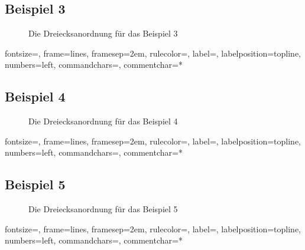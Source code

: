 \documentclass[a4paper, notitlepage, 12pt]{scrartcl}
\begin{document}
\subsection{Beispiel 3}
\begin{figure}[H] 
	
	\caption{Die Dreiecksanordnung für das Beispiel 3}
\end{figure}
%
{fontsize=\footnotesize,
	frame=lines,  %
	framesep=2em, %
	rulecolor=\color{Gray},
	label=,
	labelposition=topline,
	numbers=left,
	commandchars=\|\(\), %
	commentchar=*        %
}
\subsection{Beispiel 4}
\begin{figure}[H] 
	
	\caption{Die Dreiecksanordnung für das Beispiel 4}
\end{figure}
%
{fontsize=\footnotesize,
	frame=lines,  %
	framesep=2em, %
	rulecolor=\color{Gray},
	label=,
	labelposition=topline,
	numbers=left,
	commandchars=\|\(\), %
	commentchar=*        %
}
\subsection{Beispiel 5}
\begin{figure}[H] 
	
	\caption{Die Dreiecksanordnung für das Beispiel 5}
\end{figure}
%
{fontsize=\footnotesize,
	frame=lines,  %
	framesep=2em, %
	rulecolor=\color{Gray},
	label=,
	labelposition=topline,
	numbers=left,
	commandchars=\|\(\), %
	commentchar=*        %
}
\end{document}
